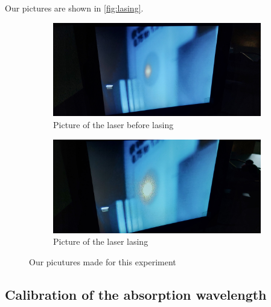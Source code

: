Our pictures are shown in \autoref{fig:lasing}.
\begin{figure}
    \centering
    \begin{subfigure}[t]{0.3\textwidth}
        \centering
        \includegraphics[width=\textwidth]{images/photo_not_lasing.jpg}
        \caption{Picture of the laser before lasing}
        \label{fig:notlase}
    \end{subfigure}
    \begin{subfigure}[t]{0.3\textwidth}
        \centering
        \includegraphics[width=\textwidth]{images/photo_lasing.jpg}
        \caption{Picture of the laser lasing}
        \label{fig:lase}
    \end{subfigure}
    \caption{Our picutures made for this experiment}
    \label{fig:lasing}
\end{figure}

\subsection{Calibration of the absorption wavelength}
\label{ssec:exe2}

